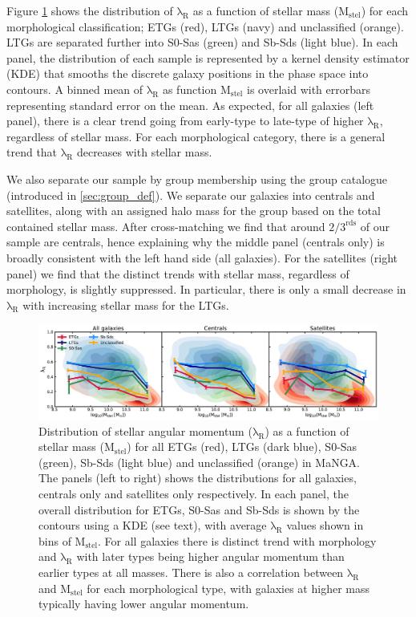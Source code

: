 Figure \ref{fig:morph_lambdaR_mstel} shows the distribution of $\mathrm{\lambda_R}$ as a function of stellar mass ($\mathrm{M_{stel}}$) for each morphological classification; ETGs (red), LTGs (navy) and unclassified (orange). LTGs are separated further into S0-Sas (green) and Sb-Sds (light blue). In each panel, the distribution of each sample is represented by a kernel density estimator (KDE) that smooths the discrete galaxy positions in the phase space into contours. A binned mean of $\mathrm{\lambda_R}$ as function $\mathrm{M_{stel}}$ is overlaid with errorbars representing standard error on the mean. As expected, for all galaxies (left panel), there is a clear trend going from early-type to late-type of higher $\mathrm{\lambda_R}$, regardless of stellar mass. For each morphological category, there is a general trend that $\mathrm{\lambda_R}$ decreases with stellar mass. 

We also separate our sample by group membership using the \citep{lim2017} group catalogue (introduced in \ref{sec:group_def}). We separate our galaxies into centrals and satellites, along with an assigned halo mass for the group based on the total contained stellar mass. After cross-matching we find that around $\mathrm{2/3^{rds}}$ of our sample are centrals, hence explaining why the middle panel (centrals only) is broadly consistent with the left hand side (all galaxies). For the satellites (right panel) we find that the distinct trends with stellar mass, regardless of morphology, is slightly suppressed. In particular, there is only a small decrease in $\mathrm{\lambda_R}$ with increasing stellar mass for the LTGs.

\begin{figure}
    \centering\includegraphics[width=\linewidth]{thesis/latex/cw_spin/morphology_lambdaR_mstel_kde_wo_unclassified.pdf}
    \caption{Distribution of stellar angular momentum ($\mathrm{\lambda_R}$) as a function of stellar mass ($\mathrm{M_{stel}}$) for all ETGs (red), LTGs (dark blue), S0-Sas (green), Sb-Sds (light blue) and unclassified (orange) in MaNGA. The panels (left to right) shows the distributions for all galaxies, centrals only and satellites only respectively. In each panel, the overall distribution for ETGs, S0-Sas and Sb-Sds is shown by the contours using a KDE (see text), with average $\mathrm{\lambda_R}$ values shown in bins of $\mathrm{M_{stel}}$. For all galaxies there is distinct trend with morphology and $\mathrm{\lambda_R}$  with later types being higher angular momentum than earlier types at all masses. There is also a correlation between $\mathrm{\lambda_R}$  and $\mathrm{M_{stel}}$ for each morphological type, with galaxies at higher mass typically having lower angular momentum.}
\label{fig:morph_lambdaR_mstel}
\end{figure}

